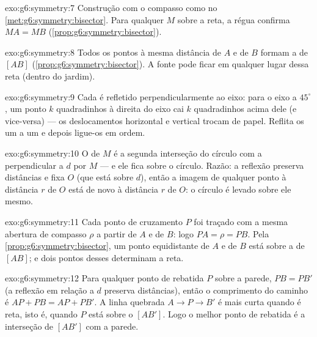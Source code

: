 \begin{solution}{exo:g6:symmetry:7}
Construção com o compasso como no \cref{met:g6:symmetry:bisector}. Para
qualquer $M$ sobre a reta, a régua confirma $MA = MB$
(\cref{prop:g6:symmetry:bisector}).
\end{solution}

\begin{solution}{exo:g6:symmetry:8}
Todos os pontos à mesma distância de $A$ e de $B$ formam a  de
$[AB]$ (\cref{prop:g6:symmetry:bisector}). A fonte pode ficar em
qualquer lugar dessa reta (dentro do jardim).
\end{solution}

\begin{solution}{exo:g6:symmetry:9}
Cada  é refletido perpendicularmente ao eixo: para o eixo a
$45^\circ$, um ponto $k$ quadradinhos à direita do eixo cai $k$
quadradinhos acima dele (e vice-versa) --- os deslocamentos horizontal
e vertical trocam de papel. Reflita os  um a um e depois
ligue-os em ordem.
\end{solution}

\begin{solution}{exo:g6:symmetry:10}
O  de $M$ é a segunda interseção do círculo com a
perpendicular a $d$ por $M$ --- e ele fica sobre o círculo. Razão: a
reflexão preserva distâncias e fixa $O$ (que está sobre $d$), então a
imagem de qualquer ponto à distância $r$ de $O$ está de novo à
distância $r$ de $O$: o círculo é levado sobre ele mesmo.
\end{solution}

\begin{solution}{exo:g6:symmetry:11}
Cada ponto de cruzamento $P$ foi traçado com a mesma abertura de
compasso $\rho$ a partir de $A$ e de $B$: logo $PA = \rho = PB$. Pela
\cref{prop:g6:symmetry:bisector}, um ponto equidistante de $A$ e de $B$
está sobre a  de $[AB]$; e dois pontos desses determinam a
reta.
\end{solution}

\begin{solution}{exo:g6:symmetry:12}
Para qualquer ponto de rebatida $P$ sobre a parede, $PB = PB'$ (a
reflexão em relação a $d$ preserva distâncias), então o comprimento do
caminho é $AP + PB = AP + PB'$. A linha quebrada $A \to P \to B'$ é
mais curta quando é reta, isto é, quando $P$ está sobre o 
$[AB']$. Logo o melhor ponto de rebatida é a interseção de $[AB']$ com
a parede.
\end{solution}

